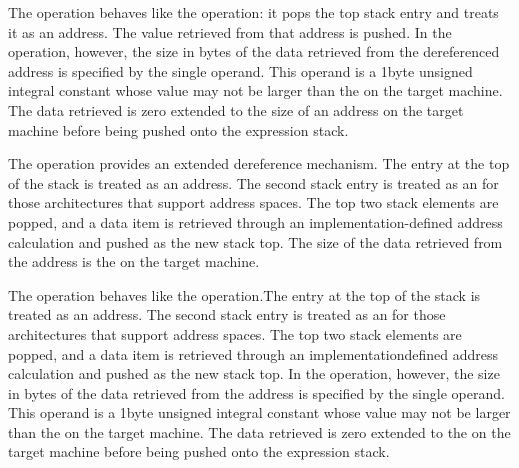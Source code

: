 \begin{enumerate}[1. ]
The  operation behaves like the 
operation: it pops the top stack entry and treats it as an
address. The value retrieved from that address is pushed. In
the  operation, however, the size in bytes
of the data retrieved from the dereferenced address is
specified by the single operand. This operand is a 1\dash byte
unsigned integral constant whose value may not be larger
than the  on the target machine. The data
retrieved is zero extended to the size of an address on the
target machine before being pushed onto the expression stack.

The  operation provides an extended dereference
mechanism. The entry at the top of the stack is treated as an
address. The second stack entry is treated as an  for those architectures that support
address spaces. The top two stack elements are popped,
and a data item is retrieved through an implementation-defined
address calculation and pushed as the new stack top. The size
of the data retrieved from the 
address is the
 on the target machine.

The  operation behaves like the
 operation.The entry at the top of the stack is
treated as an address. The second stack entry is treated as
an  for those architectures
that support 
address spaces. The top two stack
elements are popped, and a data item is retrieved through an
implementation\dash defined address calculation and pushed as the
new stack top. In the  operation, however,
the size in bytes of the data retrieved from the 
address is specified by the single operand. This operand is a
1\dash byte unsigned integral constant whose value may not be larger
than the  on the target machine. The data
retrieved is zero extended to the  on the
target machine before being pushed onto the expression stack.


\end{enumerate}
